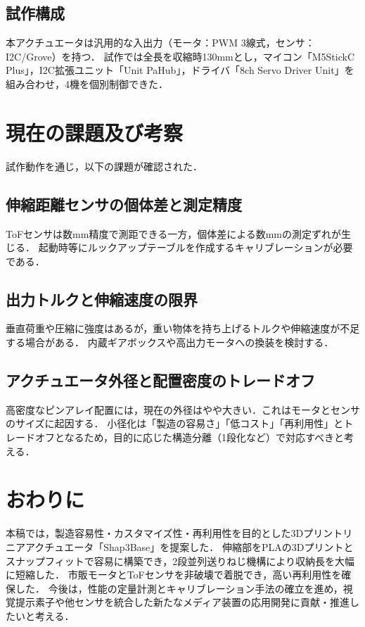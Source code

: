 \documentclass[twoside]{wiss}
\begin{document}
\subsection{試作構成}
本アクチュエータは汎用的な入出力（モータ：PWM 3線式，センサ：I2C/Grove）を持つ．
試作では全長を収縮時130mmとし，マイコン「M5StickC Plus」，I2C拡張ユニット「Unit PaHub」，ドライバ「8ch Servo Driver Unit」を組み合わせ，4機を個別制御できた．



\section{現在の課題及び考察}
試作動作を通じ，以下の課題が確認された．
\subsection*{伸縮距離センサの個体差と測定精度}
ToFセンサは数mm精度で測距できる一方，個体差による数mmの測定ずれが生じる．
起動時等にルックアップテーブルを作成するキャリブレーションが必要である．

\subsection*{出力トルクと伸縮速度の限界}
垂直荷重や圧縮に強度はあるが，重い物体を持ち上げるトルクや伸縮速度が不足する場合がある．
内蔵ギアボックスや高出力モータへの換装を検討する．

\subsection*{アクチュエータ外径と配置密度のトレードオフ}
高密度なピンアレイ配置には，現在の外径はやや大きい．これはモータとセンサのサイズに起因する．
小径化は「製造の容易さ」「低コスト」「再利用性」とトレードオフとなるため，目的に応じた構造分離（1段化など）で対応すべきと考える．

\section{おわりに}
本稿では，製造容易性・カスタマイズ性・再利用性を目的とした3Dプリントリニアアクチュエータ「Shap3Base」を提案した．
伸縮部をPLAの3Dプリントとスナップフィットで容易に構築でき，2段並列送りねじ機構により収納長を大幅に短縮した．
市販モータとToFセンサを非破壊で着脱でき，高い再利用性を確保した．
今後は，性能の定量計測とキャリブレーション手法の確立を進め，視覚提示素子や他センサを統合した新たなメディア装置の応用開発に貢献・推進したいと考える．
\end{document}
